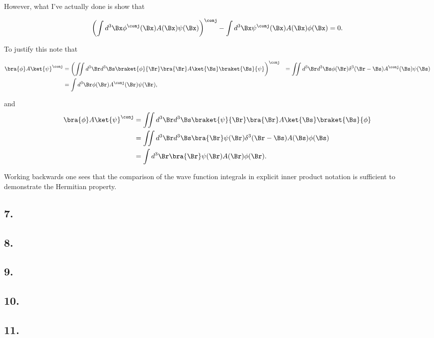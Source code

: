 However, what I've actually done is show that 

\begin{align*}
\left( \int d^3 \Bx \phi^\conj (\Bx) A(\Bx) \psi(\Bx) \right)^\conj - \int d^3 \Bx \psi^\conj (\Bx) A(\Bx) \phi(\Bx) = 0.
\end{align*}

To justify this note that 

\begin{align*}
\bra{\phi} A \ket{\psi}^\conj 
&=
\left( \iint d^3 \Br d^3 \Bs \braket{\phi}{\Br} \bra{\Br} A \ket{\Bs} \braket{\Bs}{\psi} \right)^\conj
&=
\iint d^3 \Br d^3 \Bs \phi(\Br) \delta^3(\Br - \Bs) A^\conj(\Bs) \psi(\Bs) \\
&=
\int d^3 \Br \phi(\Br) A^\conj(\Br) \psi(\Br),
\end{align*}

and
\begin{align*}
\bra{\phi} A \ket{\psi}^\conj 
&=
\iint d^3 \Br d^3 \Bs \braket{\psi}{\Br} \bra{\Br} A \ket{\Bs} \braket{\Bs}{\phi} \\
&=
\iint d^3 \Br d^3 \Bs \bra{\Br} \psi(\Br) \delta^3(\Br - \Bs) A(\Bs) \phi(\Bs) \\
&=
\int d^3 \Br \bra{\Br} \psi(\Br) A(\Br) \phi(\Br).
\end{align*}

Working backwards one sees that the comparison of the wave function integrals in explicit inner product notation is sufficient to demonstrate the Hermitian property.

\subsection{7.}
\subsection{8.}
\subsection{9.}
\subsection{10.}
\subsection{11.}

\EndArticle
